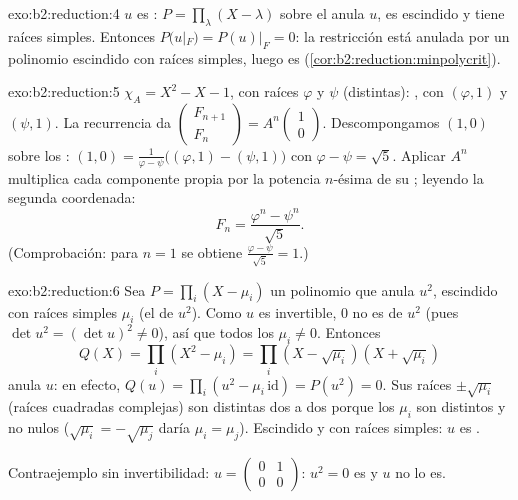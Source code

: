\begin{solution}{exo:b2:reduction:4}
$u$ es : $P = \prod_{\lambda}(X - \lambda)$ sobre el
 anula $u$, es escindido y tiene raíces simples. Entonces
$P(u|_F) = P(u)|_F = 0$: la restricción está anulada por un polinomio
escindido con raíces simples, luego es 
(\cref{cor:b2:reduction:minpolycrit}).
\end{solution}

\begin{solution}{exo:b2:reduction:5}
$\chi_A = X^2 - X - 1$, con raíces $\varphi$ y $\psi$ (distintas):
, con  $(\varphi, 1)$ y $(\psi,
1)$. La recurrencia da $\begin{pmatrix} F_{n+1}\\ F_n \end{pmatrix} =
A^n \begin{pmatrix}1\\ 0\end{pmatrix}$. Descompongamos $(1, 0)$ sobre
los : $(1,0) = \frac{1}{\varphi -
\psi}\bigl((\varphi, 1) - (\psi, 1)\bigr)$ con $\varphi - \psi =
\sqrt5$. Aplicar $A^n$ multiplica cada componente propia por la
potencia $n$-ésima de su ; leyendo la segunda
coordenada:
\[
F_n = \frac{\varphi^n - \psi^n}{\sqrt 5} .
\]
(Comprobación: para $n = 1$ se obtiene $\frac{\varphi -
\psi}{\sqrt5} = 1$.)
\end{solution}

\begin{solution}{exo:b2:reduction:6}
Sea $P = \prod_i (X - \mu_i)$ un polinomio que anula $u^2$, escindido
con raíces simples $\mu_i$ (el  de $u^2$). Como $u$ es
invertible, $0$ no es  de $u^2$ (pues $\det u^2 = (\det
u)^2 \neq 0$), así que todos los $\mu_i \neq 0$. Entonces
\[
Q(X) = \prod_i (X^2 - \mu_i) = \prod_i (X - \sqrt{\mu_i})(X +
\sqrt{\mu_i})
\]
anula $u$: en efecto, $Q(u) = \prod_i (u^2 - \mu_i\,\mathrm{id}) =
P(u^2) = 0$. Sus raíces $\pm \sqrt{\mu_i}$ (raíces cuadradas
complejas) son distintas dos a dos porque los $\mu_i$ son distintos y
no nulos ($\sqrt{\mu_i} = -\sqrt{\mu_j}$ daría $\mu_i = \mu_j$).
Escindido y con raíces simples: $u$ es .

Contraejemplo sin invertibilidad: $u = \begin{pmatrix} 0 & 1\\ 0 &
0\end{pmatrix}$: $u^2 = 0$ es  y $u$ no lo es.
\end{solution}

